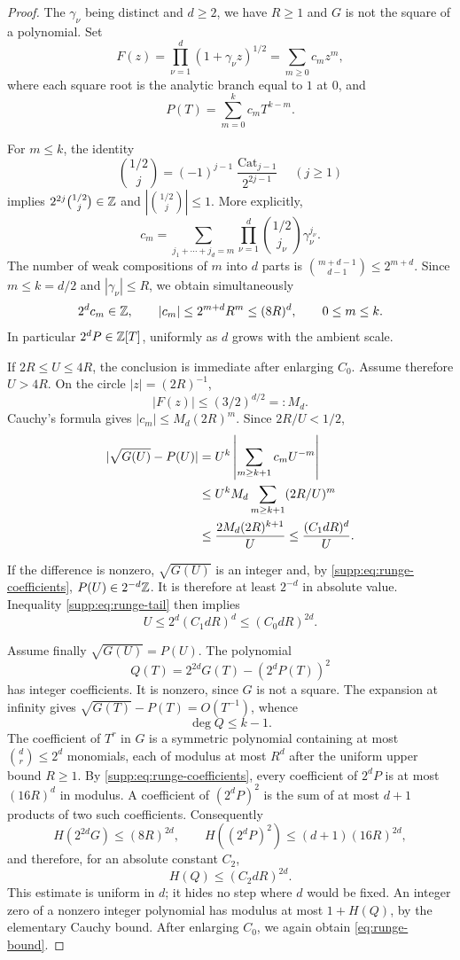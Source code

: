 \begin{proof}
The $\gamma_\nu$ being distinct and $d\ge2$, we have $R\ge1$ and $G$ is not the square of a polynomial. Set
\[
 F(z)=\prod_{\nu=1}^{d}(1+\gamma_\nu z)^{1/2}
      =\sum_{m\ge0}c_mz^m,
\]
where each square root is the analytic branch equal to $1$ at $0$, and
\[
 P(T)=\sum_{m=0}^{k}c_mT^{k-m}.
\]

For $m\le k$, the identity
\[
 \binom{1/2}{j}
 =(-1)^{j-1}\frac{\operatorname{Cat}_{j-1}}{2^{2j-1}}
 \quad(j\ge1)
\]
implies $2^{2j}\binom{1/2}{j}\in\mathbb Z$ and
$|\binom{1/2}{j}|\le1$. More explicitly,
\[
 c_m=
 \sum_{j_1+\cdots+j_d=m}
 \prod_{\nu=1}^d
 \binom{1/2}{j_\nu}\gamma_\nu^{j_\nu}.
\]
The number of weak compositions of $m$ into $d$ parts is
$\binom{m+d-1}{d-1}\le2^{m+d}$. Since $m\le k=d/2$ and
$|\gamma_\nu|\le R$, we obtain simultaneously
\begin{equation}\label{supp:eq:runge-coefficients}
 2^dc_m\in\mathbb Z,
 \qquad
 |c_m|\le2^{m+d}R^m\le(8R)^d,
 \qquad 0\le m\le k.
\end{equation}
In particular $2^dP\in\mathbb Z[T]$, uniformly as $d$ grows with the ambient scale.

If $2R\le U\le4R$, the conclusion is immediate after enlarging $C_0$. Assume therefore $U>4R$. On the circle $|z|=(2R)^{-1}$,
\[
 |F(z)|\le(3/2)^{d/2}=:M_d.
\]
Cauchy's formula gives $|c_m|\le M_d(2R)^m$. Since $2R/U<1/2$,
\begin{align}
 |\sqrt{G(U)}-P(U)|
 &=U^k\left|\sum_{m\ge k+1}c_mU^{-m}\right|\notag\\
 &\le
 U^kM_d\sum_{m\ge k+1}(2R/U)^m\notag\\
 &\le
 \frac{2M_d(2R)^{k+1}}{U}
 \le\frac{(C_1dR)^d}{U}.
 \label{supp:eq:runge-tail}
\end{align}

If the difference is nonzero, $\sqrt{G(U)}$ is an integer and, by \eqref{supp:eq:runge-coefficients}, $P(U)\in2^{-d}\mathbb Z$. It is therefore at least $2^{-d}$ in absolute value. Inequality \eqref{supp:eq:runge-tail} then implies
\[
 U\le2^d(C_1dR)^d\le(C_0dR)^{2d}.
\]

Assume finally $\sqrt{G(U)}=P(U)$. The polynomial
\[
 Q(T)=2^{2d}G(T)-(2^dP(T))^2
\]
has integer coefficients. It is nonzero, since $G$ is not a square. The expansion at infinity gives $\sqrt{G(T)}-P(T)=O(T^{-1})$, whence
\[
 \deg Q\le k-1.
\]
The coefficient of $T^r$ in $G$ is a symmetric polynomial containing at most
$\binom dr\le2^d$ monomials, each of modulus at most $R^d$ after the
uniform upper bound $R\ge1$. By \eqref{supp:eq:runge-coefficients}, every
coefficient of $2^dP$ is at most $(16R)^d$ in modulus. A coefficient
of $(2^dP)^2$ is the sum of at most $d+1$ products of two such
coefficients. Consequently
\[
 H(2^{2d}G)\le(8R)^{2d},
 \qquad
 H((2^dP)^2)\le(d+1)(16R)^{2d},
\]
and therefore, for an absolute constant $C_2$,
\[
 H(Q)\le(C_2dR)^{2d}.
\]
This estimate is uniform in $d$; it hides no step where
$d$ would be fixed. An integer zero of a nonzero integer polynomial has
modulus at most $1+H(Q)$, by the elementary Cauchy bound. After
enlarging $C_0$, we again obtain \eqref{eq:runge-bound}.
\end{proof}



